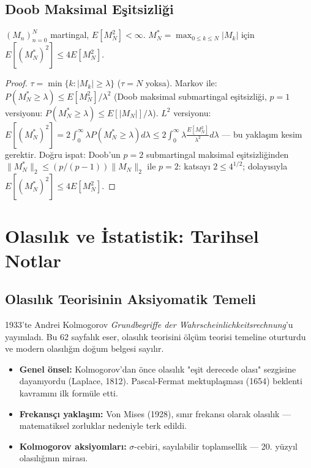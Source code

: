 \subsection{Doob Maksimal Eşitsizliği}

\begin{teorem}
$(M_n)_{n=0}^N$ martingal, $E[M_N^2]<\infty$. $M_N^*=\max_{0\leq k\leq N}|M_k|$ için $E[(M_N^*)^2]\leq 4E[M_N^2]$.
\end{teorem}
\begin{proof}
$\tau=\min\{k:|M_k|\geq\lambda\}$ ($\tau=N$ yoksa). Markov ile:
$P(M_N^*\geq\lambda)\leq E[M_N^2]/\lambda^2$ (Doob maksimal submartingal eşitsizliği, $p=1$ versiyonu: $P(M_N^*\geq\lambda)\leq E[|M_N|]/\lambda$).
$L^2$ versiyonu: $E[(M_N^*)^2]=2\int_0^\infty\lambda P(M_N^*\geq\lambda)d\lambda\leq 2\int_0^\infty\lambda\frac{E[M_N^2]}{\lambda^2}d\lambda$ --- bu yaklaşım kesim gerektir. Doğru ispat: Doob'un $p=2$ submartingal maksimal eşitsizliğinden $\|M_N^*\|_2\leq (p/(p-1))\|M_N\|_2$ ile $p=2$: katsayı $2\leq 4^{1/2}$; dolayısıyla $E[(M_N^*)^2]\leq 4E[M_N^2]$.
\end{proof}

\section{Olasılık ve İstatistik: Tarihsel Notlar}
\label{app:tarihsel}

\subsection{Olasılık Teorisinin Aksiyomatik Temeli}

1933'te Andrei Kolmogorov \textit{Grundbegriffe der Wahrscheinlichkeitsrechnung}'u yayımladı. Bu 62 sayfalık eser, olasılık teorisini ölçüm teorisi temeline oturturdu ve modern olasılığın doğum belgesi sayılır.

\begin{itemize}
  \item \textbf{Genel önsel:} Kolmogorov'dan önce olasılık "eşit derecede olası" sezgisine dayanıyordu (Laplace, 1812). Pascal-Fermat mektuplaşması (1654) beklenti kavramını ilk formüle etti.
  \item \textbf{Frekansçı yaklaşım:} Von Mises (1928), sınır frekansı olarak olasılık --- matematiksel zorluklar nedeniyle terk edildi.
  \item \textbf{Kolmogorov aksiyomları:} $\sigma$-cebiri, sayılabilir toplamsellik --- 20. yüzyıl olasılığının mirası.
\end{itemize}

